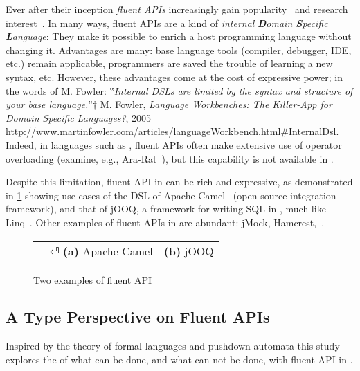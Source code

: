 Ever after their inception \emph{fluent APIs}
  increasingly gain popularity~\cite{Bauer:2005,Freeman:Pryce:06,Larsen:2012} and research
  interest~\cite{Deursen:2000,Kabanov:2008}.
In many ways, fluent APIs are a kind of
  \emph{internal} \emph{\textbf Domain \textbf Specific \textbf Language}:
They make it possible to enrich a host programming language without changing it.
Advantages are many: base language tools (compiler, debugger, IDE, etc.) remain
  applicable, programmers are saved the trouble of learning a new syntax, etc.
However, these advantages come at the cost of expressive power;
  in the words of M. Fowler:
  ‟\emph{Internal DSLs are limited by the syntax and structure of your base language.}”†
  {M. Fowler, \emph{Language Workbenches: The Killer-App for Domain Specific Languages?}, 
    2005
    \newline
  \url{http://www.martinfowler.com/articles/languageWorkbench.html\#InternalDsl}.}
Indeed, in languages such as \CC{}, fluent APIs
  often make extensive use of operator overloading (examine, e.g., \textsf{Ara-Rat}~\cite{Gil:Lenz:07}),
  but this capability is not available in \Java.

Despite this limitation, fluent API in \Java can be rich and expressive, as demonstrated
  in \cref{Figure:DSL} showing use cases of the DSL of Apache Camel~\cite{Ibsen:Anstey:10}
(open-source integration framework),
and that of jOOQ, a framework for writing
  SQL in \Java, much like Linq~\cite{Meijer:Beckman:Bierman:06}.
Other examples of fluent APIs in \Java are abundant: jMock, Hamcrest,~\cite{find:manY:more:and:put:urlref:to:these}.

\begin{figure}[H]
  \caption{\label{Figure:DSL} Two examples of \Java fluent API}
  \begin{tabular}{@{}c@{}c@{}}
    \parbox[c]{44ex}{} &
    \hspace{-3ex} \parbox[c]{59ex}{} ⏎
    \textbf{(a)} Apache Camel                                          & \textbf{(b)} jOOQ
  \end{tabular}
\end{figure}

\subsection{A Type Perspective on Fluent APIs}
Inspired by the theory of formal languages and pushdown automata
this study explores the of what can be done, and what can not be done, with fluent API in \Java.

